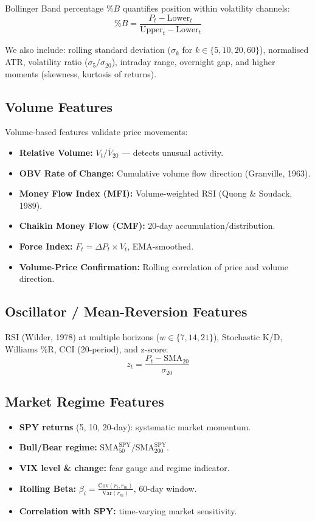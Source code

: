 \documentclass[12pt,a4paper]{article}
\begin{document}
Bollinger Band percentage $\%B$ quantifies position within volatility channels:
\begin{equation}
    \%B = \frac{P_t - \text{Lower}_t}{\text{Upper}_t - \text{Lower}_t}
\end{equation}

We also include: rolling standard deviation ($\sigma_k$ for $k \in \{5,10,20,60\}$), normalised ATR, volatility ratio ($\sigma_5/\sigma_{20}$), intraday range, overnight gap, and higher moments (skewness, kurtosis of returns).

\subsection{Volume Features}
Volume-based features validate price movements:
\begin{itemize}
    \item \textbf{Relative Volume:} $V_t / \overline{V}_{20}$ --- detects unusual activity.
    \item \textbf{OBV Rate of Change:} Cumulative volume flow direction (Granville, 1963).
    \item \textbf{Money Flow Index (MFI):} Volume-weighted RSI (Quong \& Soudack, 1989).
    \item \textbf{Chaikin Money Flow (CMF):} 20-day accumulation/distribution.
    \item \textbf{Force Index:} $F_t = \Delta P_t \times V_t$, EMA-smoothed.
    \item \textbf{Volume-Price Confirmation:} Rolling correlation of price and volume direction.
\end{itemize}

\subsection{Oscillator / Mean-Reversion Features}
RSI (Wilder, 1978) at multiple horizons ($w \in \{7, 14, 21\}$), Stochastic K/D, Williams \%R, CCI (20-period), and z-score:
\begin{equation}
    z_t = \frac{P_t - \text{SMA}_{20}}{\sigma_{20}}
\end{equation}

\subsection{Market Regime Features}
\begin{itemize}
    \item \textbf{SPY returns} (5, 10, 20-day): systematic market momentum.
    \item \textbf{Bull/Bear regime:} $\text{SMA}_{50}^{\text{SPY}} / \text{SMA}_{200}^{\text{SPY}}$.
    \item \textbf{VIX level \& change:} fear gauge and regime indicator.
    \item \textbf{Rolling Beta:} $\beta_i = \frac{\text{Cov}(r_i, r_m)}{\text{Var}(r_m)}$, 60-day window.
    \item \textbf{Correlation with SPY:} time-varying market sensitivity.
\end{itemize}
\end{document}
